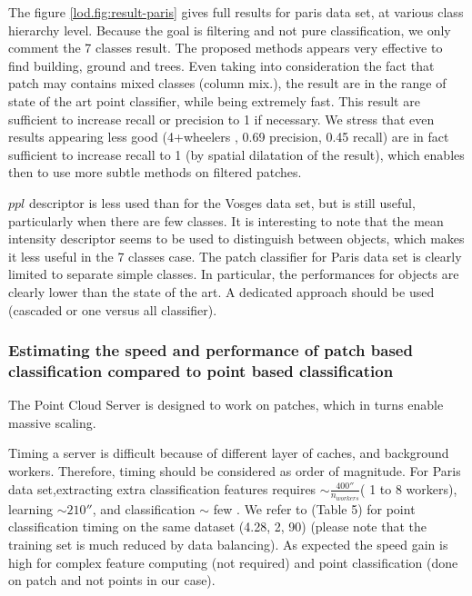 		  The figure \ref{lod.fig:result-paris} gives full results for paris data set, at various class hierarchy level.
		  Because the goal is filtering and not pure classification, we only comment the 7 classes result. The proposed methods appears very effective to find building, ground and trees.
		  Even taking into consideration the fact that patch may contains mixed classes (column mix.), the result are in the range of state of the art point classifier, while being extremely fast. 
		  This result are sufficient to increase recall or precision to 1 if necessary.
		  We stress that even results appearing less good (4+wheelers , 0.69 precision, 0.45 recall) are in fact sufficient to increase recall to 1 (by spatial dilatation of the result), which enables then to use more subtle methods on filtered patches.
		  
		  $ppl$ descriptor is less used than for the Vosges data set, but is still useful, particularly when there are few classes.
		  It is interesting to note that the mean intensity descriptor seems to be used to distinguish between objects, which makes it less useful in the 7 classes case.
		  The patch classifier for Paris data set is clearly limited to separate simple classes. In particular, the performances for objects are clearly lower than the state of the art. A dedicated approach should be used (cascaded or one versus all classifier). 
	  
	  
	  \subsubsection{Estimating the speed and performance of patch based classification compared to point based classification}
		  The Point Cloud Server is designed to work on patches, which in turns enable massive scaling. 
		  
		  Timing a server is difficult because of different layer of caches, and background workers. Therefore, timing should be considered as order of magnitude.
		  For Paris data set,extracting extra classification features requires $\sim \frac{400 \second}{n_{workers}}$( 1 to 8 workers), learning $\sim 210 \second$,
		  and classification $\sim$ few \second.
		  We refer to \cite{Weinmann2015}(Table 5) for point classification timing on the same dataset (4.28\hour, 2\second, 90\second ) (please note that the training set is much reduced by data balancing).
		  As expected the speed gain is high for complex feature computing (not required) and point classification (done on patch and not points in our case).
		  
